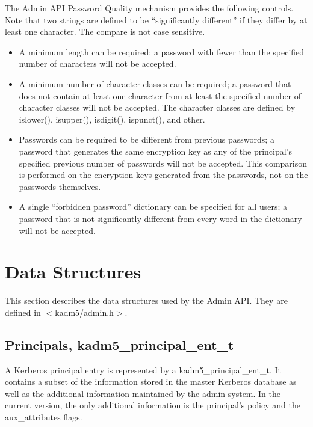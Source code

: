 The Admin API Password Quality mechanism provides the following
controls.  Note that two strings are defined to be ``significantly
different'' if they differ by at least one character. The compare is not
case sensitive.

\begin{itemize}
\item A minimum length can be required; a password with
fewer than the specified number of characters will not be accepted.

\item A minimum number of character classes can be required; a
password that does not contain at least one character from at least
the specified number of character classes will not be accepted.  The
character classes are defined by islower(), isupper(), isdigit(),
ispunct(), and other.

\item Passwords can be required to be different from
previous passwords; a password that generates the same encryption key
as any of the principal's specified previous number of passwords will
not be accepted.  This comparison is performed on the encryption keys
generated from the passwords, not on the passwords themselves.

\item A single ``forbidden password'' dictionary can be specified for all
users; a password that is not significantly different from every word
in the dictionary will not be accepted.
\end{itemize}

\section{Data Structures}

This section describes the data structures used by the Admin API.
They are defined in $<$kadm5/admin.h$>$.

\subsection{Principals, kadm5_principal_ent_t}
\label{sec:principal-structure}

A Kerberos principal entry is represented by a kadm5_principal_ent_t.
It contains a subset of the information stored in the master Kerberos
database as well as the additional information maintained by the admin
system.  In the current version, the only additional information is
the principal's policy and the aux_attributes flags.

